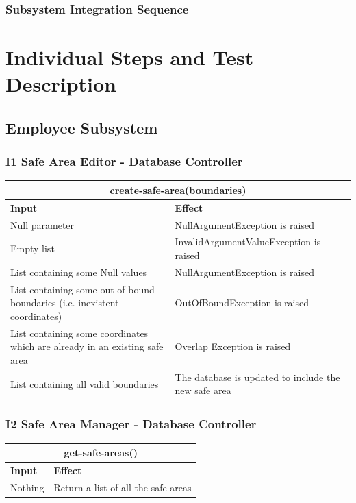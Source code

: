 \documentclass{article}
\begin{document}


\subsubsection{Subsystem Integration Sequence}


\newpage
\section{Individual Steps and Test Description}
\subsection{Employee Subsystem}
\subsubsection{I1 Safe Area Editor - Database Controller}
\begin{tabular}{ |p{5cm}|p{7cm}| }
  \hline
  \multicolumn{2}{|c|}{create-safe-area(boundaries)} \\
  \hline
  \textbf{Input} & \textbf{Effect} \\
  \hline
  Null parameter & NullArgumentException is raised\\
  \hline
  Empty list & InvalidArgumentValueException is raised\\
  \hline
  List containing some Null values & NullArgumentException is raised\\
  \hline
  List containing some out-of-bound boundaries (i.e. inexistent coordinates) & OutOfBoundException is raised\\
  \hline
  List containing some coordinates which are already in an existing safe area & Overlap Exception is raised\\
  \hline
  List containing all valid boundaries & The database is updated to include the new safe area\\
  \hline
\end{tabular}
\subsubsection{I2 Safe Area Manager - Database Controller}
\begin{tabular}{ |p{5cm}|p{7cm}| }
  \hline
  \multicolumn{2}{|c|}{get-safe-areas()} \\
  \hline
  \textbf{Input} & \textbf{Effect} \\
  \hline
  Nothing & Return a list of all the safe areas\\
  \hline
\end{tabular}
\end{document}
